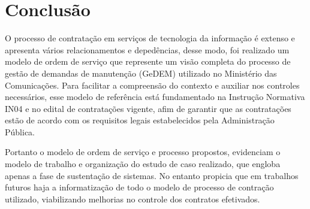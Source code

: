 \section{Conclusão}

O processo de contratação em serviços de tecnologia da informação é extenso e
apresenta vários relacionamentos e depedências, desse modo, foi realizado um
modelo de ordem de serviço que represente um visão completa do processo de
gestão de demandas de manutenção (GeDEM) utilizado no Ministério das
Comunicações. Para facilitar a compreensão do contexto e auxiliar nos controles
necessários, esse modelo de referência está fundamentado na Instrução Normativa
IN04 e no edital de contratações vigente, afim de garantir que as contratações
estão de acordo com os requisitos legais estabelecidos pela Administração
Pública.

Portanto o modelo de ordem de serviço e processo propostos, evidenciam o modelo
de trabalho e organização do estudo de caso realizado, que engloba apenas a
fase de sustentação de sistemas. No entanto propicia que em trabalhos futuros
haja a informatização de todo o modelo de processo de contração utilizado,
viabilizando melhorias no controle dos contratos efetivados.
